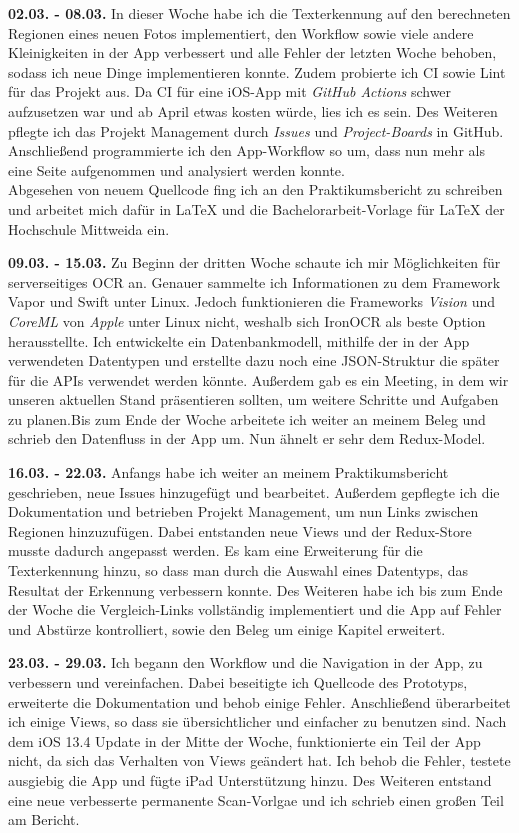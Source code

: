 \documentclass[nomenclature, oneside, 150]{HSMW-Thesis}
\begin{document}
	\textbf{02.03. - 08.03.} 
	In dieser Woche habe ich die Texterkennung auf den berechneten Regionen eines neuen Fotos implementiert, den Workflow sowie viele andere Kleinigkeiten in der App verbessert und alle Fehler der letzten Woche behoben, sodass ich neue Dinge implementieren konnte. Zudem probierte ich CI sowie Lint für das Projekt aus. Da CI für eine iOS-App mit \textit{GitHub Actions} schwer aufzusetzen war und ab April etwas kosten würde, lies ich es sein. Des Weiteren pflegte ich das Projekt Management durch \textit{Issues} und \textit{Project-Boards} in GitHub. Anschließend programmierte ich den App-Workflow so um, dass nun mehr als eine Seite aufgenommen und analysiert werden konnte. \\ 			
	Abgesehen von neuem Quellcode fing ich an den Praktikumsbericht zu schreiben und arbeitet mich dafür in \LaTeX \xspace und die Bachelorarbeit-Vorlage für \LaTeX \xspace der Hochschule Mittweida ein.
	
	\textbf{09.03. - 15.03.} 
	Zu Beginn der dritten Woche schaute ich mir Möglichkeiten für serverseitiges OCR an. Genauer sammelte ich Informationen zu dem Framework Vapor und Swift unter Linux. Jedoch funktionieren die Frameworks \textit{Vision} und \textit{CoreML} von \textit{Apple} unter Linux nicht, weshalb sich IronOCR als beste Option herausstellte. Ich entwickelte ein Datenbankmodell, mithilfe der in der App verwendeten Datentypen und erstellte dazu noch eine JSON-Struktur die später für die APIs verwendet werden könnte. Außerdem gab es ein Meeting, in dem wir unseren aktuellen Stand präsentieren sollten, um weitere Schritte und Aufgaben zu planen.Bis zum Ende der Woche arbeitete ich weiter an meinem Beleg und schrieb den Datenfluss in der App um. Nun ähnelt er sehr dem Redux-Model.
	
	\textbf{16.03. - 22.03.} 
	Anfangs habe ich weiter an meinem Praktikumsbericht geschrieben, neue Issues hinzugefügt und bearbeitet. Außerdem gepflegte ich die Dokumentation und betrieben Projekt Management, um nun Links zwischen Regionen hinzuzufügen. Dabei entstanden neue Views und der Redux-Store musste dadurch angepasst werden. Es kam eine Erweiterung für die Texterkennung hinzu, so dass man durch die Auswahl eines Datentyps, das Resultat der Erkennung verbessern konnte. Des Weiteren habe ich bis zum Ende der Woche die Vergleich-Links vollständig implementiert und die App auf Fehler und Abstürze kontrolliert, sowie den Beleg um einige Kapitel erweitert.
	
	\textbf{23.03. - 29.03.} 
	Ich begann den Workflow und die Navigation in der App, zu verbessern und vereinfachen. Dabei beseitigte ich Quellcode des Prototyps, erweiterte die Dokumentation und behob einige Fehler. Anschließend überarbeitet ich einige Views, so dass sie übersichtlicher und einfacher zu benutzen sind. Nach dem iOS 13.4 Update in der Mitte der Woche, funktionierte ein Teil der App nicht, da sich das Verhalten von Views geändert hat. Ich behob die Fehler, testete ausgiebig die App und fügte iPad Unterstützung hinzu. Des Weiteren entstand eine neue verbesserte permanente Scan-Vorlgae und ich schrieb einen großen Teil am Bericht.
	
\end{document}
